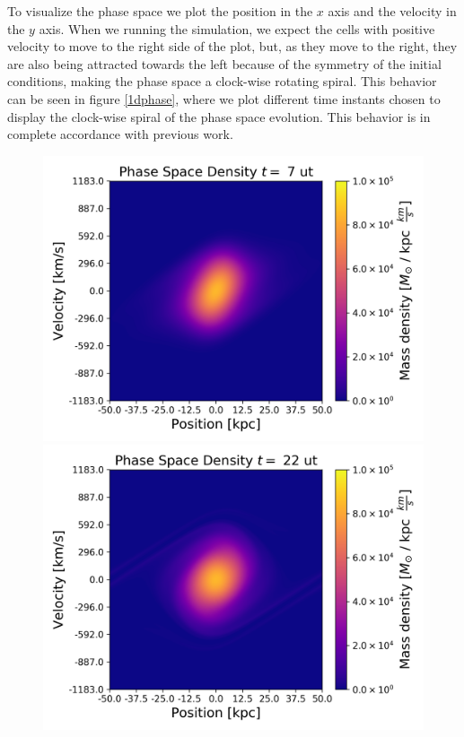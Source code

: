 To visualize the phase space we plot the position in the $x$ axis and the velocity in the $y$ axis. When we running the simulation, we expect the cells with positive velocity to move to the right side of the plot, but, as they move to the right, they are also being attracted towards the left because of the symmetry of the initial conditions, making the phase space a clock-wise rotating spiral. This behavior can be seen in figure \ref{1dphase}, where we plot different time instants chosen to display the clock-wise spiral of the phase space evolution. This behavior is in complete accordance with previous work.
\begin{figure}[ht!]
    \centering
    \includegraphics[scale=0.45]{imag/phase7.png}
    \includegraphics[scale=0.45]{imag/phase22.png}

\end{figure}

